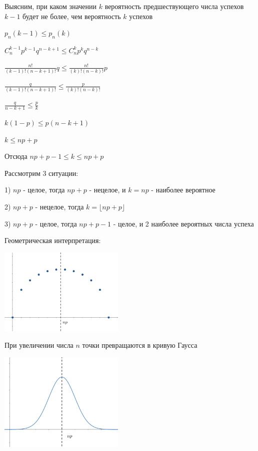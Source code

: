 \documentclass[12pt]{article}
\begin{document}
    Выясним, при каком значении $k$ вероятность предшествующего числа успехов $k - 1$ будет не более, чем вероятность $k$ успехов

    $p_n(k - 1) \leq p_n(k)$

    $C_n^{k - 1} p^{k - 1} q^{n - k + 1} \leq C^k_n p^k q^{n - k}$

    $\frac{n!}{(k - 1)! (n - k + 1)!} q \leq \frac{n!}{(k)! (n - k)!} p$

    $\frac{q}{(k - 1)! (n - k + 1)!} \leq \frac{p}{(k)! (n - k)!}$

    $\frac{q}{n - k + 1} \leq \frac{p}{k}$

    $k(1 - p) \leq p(n - k + 1)$

    $k \leq np + p$

    Отсюда $np + p - 1 \leq k \leq  np + p$

    Рассмотрим 3 ситуации:

    1) $np$ - целое, тогда $np + p$ - нецелое, и $k = np$ - наиболее вероятное

    2) $np + p$ - нецелое, тогда $k = \lfloor np + p \rfloor$

    3) $np + p$ - целое, тогда $np + p - 1$ - целое, и 2 наиболее вероятных числа успеха

    Геометрическая интерпретация:

    \begin{center}
        \includegraphics[width=6cm]{probtheory/images/probtheory_2024_09_24_1}
    \end{center}

    При увеличении числа $n$ точки превращаются в кривую Гаусса

    \begin{center}
        \includegraphics[width=6cm]{probtheory/images/probtheory_2024_09_24_2}
    \end{center}
\end{document}
